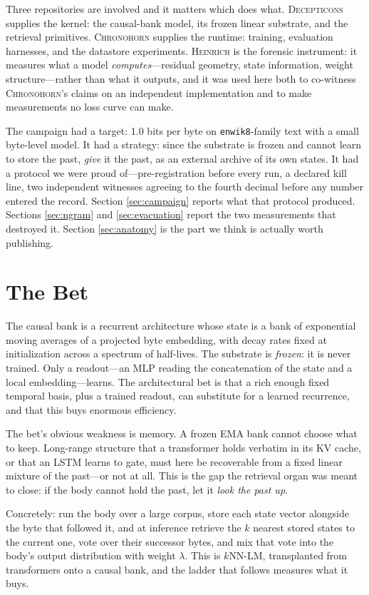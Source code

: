 \documentclass[11pt,a4paper]{article}
\newcommand{\heinrich}{\textsc{Heinrich}}
\newcommand{\chronohorn}{\textsc{Chronohorn}}
\newcommand{\decepticons}{\textsc{Decepticons}}
\begin{document}
Three repositories are involved and it matters which does what. \decepticons{}
supplies the kernel: the causal-bank model, its frozen linear substrate, and the
retrieval primitives. \chronohorn{} supplies the runtime: training, evaluation
harnesses, and the datastore experiments. \heinrich{} is the forensic instrument:
it measures what a model \emph{computes}---residual geometry, state information,
weight structure---rather than what it outputs, and it was used here both to
co-witness \chronohorn{}'s claims on an independent implementation and to make
measurements no loss curve can make.

The campaign had a target: 1.0 bits per byte on \texttt{enwik8}-family text with a
small byte-level model. It had a strategy: since the substrate is frozen and cannot
learn to store the past, \emph{give} it the past, as an external archive of its own
states. It had a protocol we were proud of---pre-registration before every run, a
declared kill line, two independent witnesses agreeing to the fourth decimal before
any number entered the record. Section \ref{sec:campaign} reports what that
protocol produced. Sections \ref{sec:ngram} and \ref{sec:evacuation} report the two
measurements that destroyed it. Section \ref{sec:anatomy} is the part we think is
actually worth publishing.

\section{The Bet}

The causal bank is a recurrent architecture whose state is a bank of exponential
moving averages of a projected byte embedding, with decay rates fixed at
initialization across a spectrum of half-lives. The substrate is \emph{frozen}: it
is never trained. Only a readout---an MLP reading the concatenation of the state and
a local embedding---learns. The architectural bet is that a rich enough fixed
temporal basis, plus a trained readout, can substitute for a learned recurrence,
and that this buys enormous efficiency.

The bet's obvious weakness is memory. A frozen EMA bank cannot choose what to keep.
Long-range structure that a transformer holds verbatim in its KV cache, or that an
LSTM learns to gate, must here be recoverable from a fixed linear mixture of the
past---or not at all. This is the gap the retrieval organ was meant to close: if
the body cannot hold the past, let it \emph{look the past up}.

Concretely: run the body over a large corpus, store each state vector alongside the
byte that followed it, and at inference retrieve the $k$ nearest stored states to
the current one, vote over their successor bytes, and mix that vote into the body's
output distribution with weight $\lambda$. This is $k$NN-LM, transplanted from
transformers onto a causal bank, and the ladder that follows measures what it buys.
\end{document}
